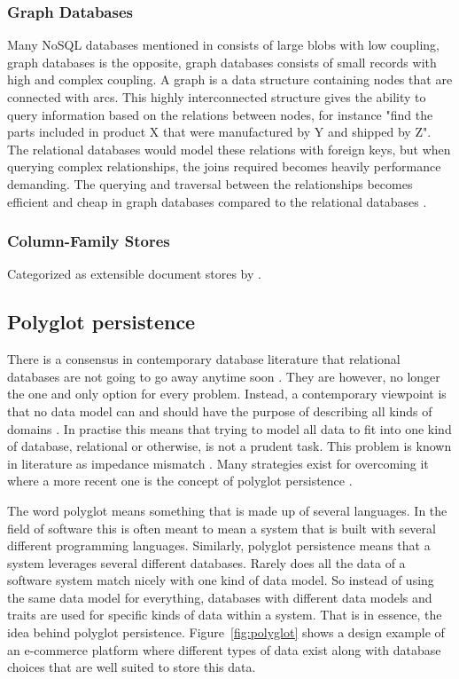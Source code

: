 \subsubsection{Graph Databases}

Many NoSQL databases mentioned in \cite{Catell} consists of large blobs with low coupling, graph databases is the opposite, graph databases consists of small records with high and complex coupling. A graph is a data structure containing nodes that are connected with arcs\cite{NoSQLDistilled}. This highly interconnected structure gives the ability to query information based on the relations between nodes, for instance "find the parts included in product X that were manufactured by Y and shipped by Z". The relational databases would model these relations with foreign keys, but when querying complex relationships, the joins required becomes heavily performance demanding. The querying and traversal between the relationships becomes efficient and cheap in graph databases compared to the relational databases \cite{NoSQLDistilled}.

\subsubsection{Column-Family Stores}
Categorized as extensible document stores by \cite{Catell}. 


\subsection{Polyglot persistence}

There is a consensus in contemporary database literature that relational databases are not going to go away anytime soon \cite{Catell, NoSQLDistilled, NoSQLSurvey}. They are however, no longer the one and only option for every problem. Instead, a contemporary viewpoint is that no data model can and should have the purpose of describing all kinds of domains \cite{NoSQLDistilled, NoSQLSurvey}. In practise this means that trying to model all data to fit into one kind of database, relational or otherwise, is not a prudent task. This problem is known in literature as impedance mismatch \cite{ORM}. Many strategies \cite{ORM} exist for overcoming it where a more recent one is the concept of polyglot persistence \cite{NoSQLDistilled}. 

The word polyglot means something that is made up of several languages. In the field of software this is often meant to mean a system that is built with several different programming languages. Similarly, polyglot persistence means that a system leverages several different databases. Rarely does all the data of a software system match nicely with one kind of data model. So instead of using the same data model for everything, databases with different data models and traits are used for specific kinds of data within a system. That is in essence, the idea behind polyglot persistence. Figure~\ref{fig:polyglot} shows a design example of an e-commerce platform where different types of data exist along with database choices that are well suited to store this data.

